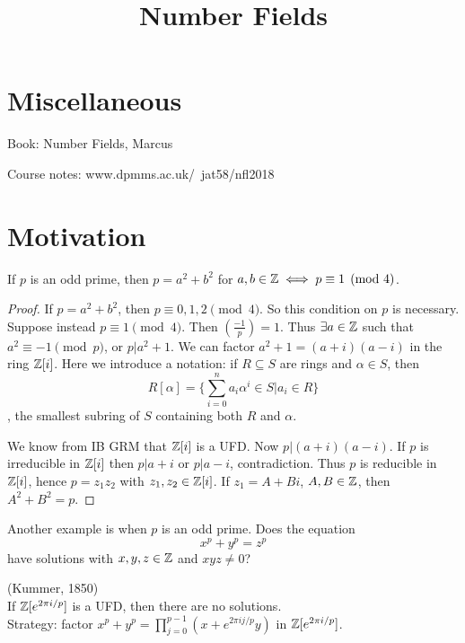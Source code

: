 \documentclass[a4paper]{article}
\begin{document}
\title{Number Fields}

\maketitle

\newpage

\tableofcontents

\newpage

\section{Miscellaneous}

Book: Number Fields, Marcus

Course notes: www.dpmms.ac.uk/~jat58/nfl2018

\newpage

\section{Motivation}
\begin{thm}
If $p$ is an odd prime, then $p=a^2+b^2$ for $a,b \in \mathbb{Z} \iff p \equiv 1 \pmod 4$.
\begin{proof}
If $p=a^2+b^2$, then $p\equiv 0,1,2 \pmod 4$. So this condition on $p$ is necessary.\\
Suppose instead $p \equiv 1 \pmod 4$. Then $\left(\frac{-1}{p}\right) = 1$. Thus $\exists a \in \mathbb{Z}$ such that $a^2 \equiv -1 \pmod p$, or $p|a^2+1$. We can factor $a^2+1=(a+i)(a-i)$ in the ring $\mathbb{Z}[i]$. Here we introduce a notation: if $R \subseteq S$ are rings and $\alpha \in S$, then $$R[\alpha] = \{\sum_{i=0}^n a_i \alpha^i \in S | a_i \in R\}$$, the smallest subring of $S$ containing both $R$ and $\alpha$.

We know from IB GRM that $\mathbb{Z}[i]$ is a UFD. Now $p|(a+i)(a-i)$. If $p$ is irreducible in $\mathbb{Z}[i]$ then $p|a+i$ or $p|a-i$, contradiction. Thus $p$ is reducible in $\mathbb{Z}[i]$, hence $p=z_1z_2$ with $z_1,z_2 \in \mathbb{Z}[i]$. If $z_1 = A+Bi$, $A,B\in \mathbb{Z}$, then $A^2+B^2 = p$.
\end{proof}
\end{thm}

Another example is when $p$ is an odd prime. Does the equation $$x^p+y^p=z^p$$ have solutions with $x,y,z\in \mathbb{Z}$ and $xyz \neq 0$?

\begin{thm} (Kummer, 1850)\\
If $\mathbb{Z}[e^{2\pi i/p}]$ is a UFD, then there are no solutions.\\
Strategy: factor $x^p+y^p = \prod_{j=0}^{p-1} (x+e^{2\pi ij/p}y)$ in $\mathbb{Z}[e^{2\pi i/p}]$.
\end{thm}
\end{document}
